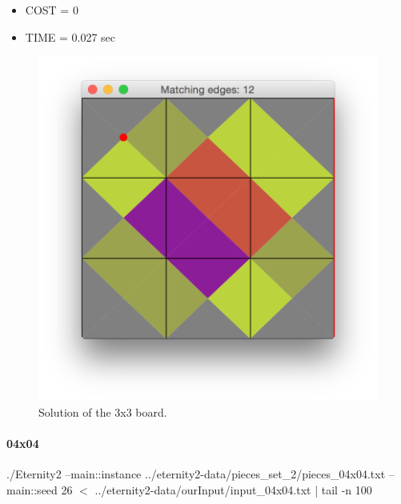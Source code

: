 	\begin{itemize}
		\item COST = 0
		\item TIME = 0.027 sec
	\end{itemize}
	\begin{figure}[H]
	\centering
	\includegraphics[scale=0.25]{img/sol_03x03}
	\caption{Solution of the 3x3 board.}
	\end{figure}



	\paragraph{04x04}
	./Eternity2 --main::instance ../eternity2-data/pieces\_set\_2/pieces\_04x04.txt --main::seed 26 $<$ ../eternity2-data/ourInput/input\_04x04.txt | tail -n 100

